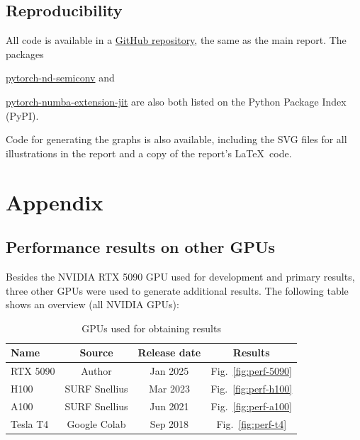 \documentclass[a4paper, 12pt, openright]{report}
\begin{document}
\section{Reproducibility}
All code is available in a \href{https://github.com/p-adema/quadratic-conv}{\color{cyan}GitHub repository}, the same as the main report. The packages {\href{https://pypi.org/project/pytorch-nd-semiconv}{\color{cyan}pytorch-nd-semiconv} and {\href{https://pypi.org/project/pytorch-numba-extension-jit/}{\color{cyan}pytorch-numba-extension-jit} are also both listed on the Python Package Index (PyPI). 

Code for generating the graphs is also available, including the SVG files for all illustrations in the report and a copy of the report's \LaTeX \  code.




{\footnotesize }

\newpage
{}
\chapter*{Appendix}
\setcounter{section}{0}
\renewcommand\thesection{\Alph{section}}
\section{Performance results on other GPUs}
\label{sec:other-gpu}
Besides the NVIDIA RTX 5090 GPU used for development and primary results, three other GPUs were used to generate additional results.
The following table shows an overview (all NVIDIA GPUs):
\begin{table}[!htbp]
\centering
\begin{tabular}{l|*3c}
\toprule
Name & Source & Release date & Results\\
\midrule
RTX 5090 & Author &  Jan 2025 & Fig.\ \ref{fig:perf-5090}  \\
H100 & SURF Snellius &  Mar 2023 & Fig.\ \ref{fig:perf-h100}  \\
A100 & SURF Snellius &  Jun 2021 & Fig.\ \ref{fig:perf-a100}  \\
Tesla T4 & Google Colab &  Sep 2018 & Fig.\ \ref{fig:perf-t4}  \\
\bottomrule
\end{tabular}
\caption{GPUs used for obtaining results}
\label{table:gpus}
\end{table}

}}
\end{document}
